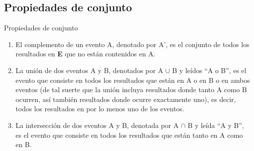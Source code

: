 \documentclass[11pt]{beamer}
\begin{document}
      \subsection*{Propiedades de conjunto}
      \begin{frame}{}
          \begin{block}{Propiedades de conjunto}
              \begin{enumerate}[<+->]
                  \item El complemento de un evento A, denotado por A', es el conjunto de todos los resultados en \textbf{E} que no están contenidos en A.
                  \item La unión de dos eventos A y B, denotados por A $\cup$ B y leídos “A o B”, es el evento que consiste en todos los resultados que están en A o en B o en ambos eventos
(de tal suerte que la unión incluya resultados donde tanto A como B ocurren, así
también resultados donde ocurre exactamente uno), es decir, todos los resultados
en por lo menos uno de los eventos.
                  \item La intersección de dos eventos A y B, denotada por A $\cap$ B y leída “A y B”, es el
evento que consiste en todos los resultados que están tanto en A como en B.
              \end{enumerate}
          \end{block}
      \end{frame}
\end{document}

